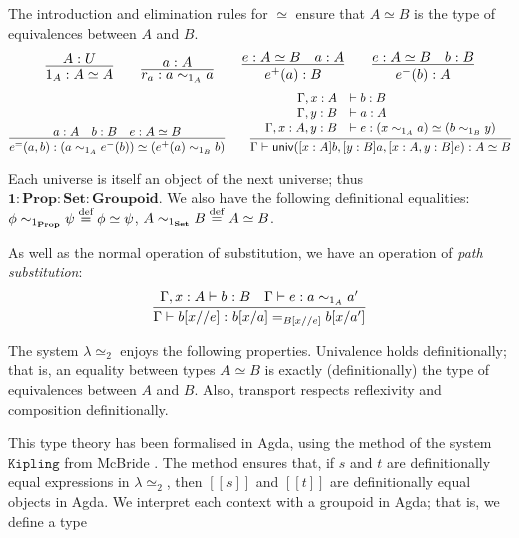 \documentclass{easychair}
\newcommand{\Prop}{\ensuremath{\mathbf{Prop}}}
\newcommand{\Set}{\ensuremath{\mathbf{Set}}}
\newcommand{\Groupoid}{\ensuremath{\mathbf{Groupoid}}}
\newcommand{\LEtwo}{\ensuremath{\lambda \! \! \simeq_2}}
\newcommand{\eqdef}{\mathrel{\smash{\stackrel{\text{def}}{=}}}}
\newcommand{\brackets}[1]{\ensuremath{[ \! [ {#1} ] \! ]}}
\begin{document}
The introduction and elimination rules for $\simeq$ ensure that $A \simeq B$ is the type of equivalences between $A$ and $B$.
\[ \infer{1_A : A \simeq A}{A : U} \qquad \infer{r_a : a \sim_{1_A} a}{a : A} \qquad \infer{e^+(a) : B}{e : A \simeq B \quad a : A} \qquad \infer{e^-(b) : A}{e : A \simeq B \quad b : B} \]
\[ \infer{e^=(a,b) : (a \sim_{1_A} e^-(b)) \simeq (e^+(a) \sim_{1_B} b)}{a : A \quad b : B \quad e : A \simeq B} \qquad
\infer{\Gamma \vdash \mathsf{univ}([x : A] b, [y : B] a, [x : A, y : B]e) : A \simeq B}{\begin{array}{rl}
\Gamma, x : A & \vdash b : B \\
\Gamma, y : B & \vdash a : A \\
\Gamma, x : A, y : B & \vdash e : (x \sim_{1_A} a) \simeq (b \sim_{1_B} y)
\end{array}} \]

Each universe is itself an object of the next universe; thus $\mathbf{1} : \Prop : \Set : \Groupoid$.  We also have the following definitional equalities:
$\phi \sim_{1_\Prop} \psi \eqdef \phi \simeq \psi$, 
$A \sim_{1_\Set} B \eqdef A \simeq B$.

As well as the normal operation of substitution, we have an operation of \emph{path substitution}:
\[ \infer{\Gamma \vdash b [x // e] : b [x/a] =_{B[x//e]} b[x/a']}{\Gamma, x : A \vdash b : B \quad \Gamma \vdash e : a \sim_{1_A} a'} \]

The system $\LEtwo$ enjoys the following properties.  Univalence holds definitionally; that is, an equality between types $A \simeq B$ is exactly (definitionally) the type of equivalences between $A$ and $B$.  Also, transport respects reflexivity and composition definitionally.

This type theory has been formalised in Agda, using the method of the system $\mathtt{Kipling}$ from McBride \cite{McBridea}.  The method ensures that, if $s$ and $t$ are definitionally equal expressions in $\lambda \simeq_2$, then $\brackets{s}$ and $\brackets{t}$ are definitionally equal objects in Agda.  We interpret each context with a groupoid in Agda; that is, we define
a type

\end{document}
